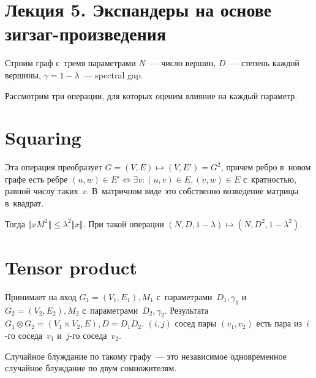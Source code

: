 \documentclass{article}
\begin{document}
\section*{Лекция 5. Экспандеры на основе зигзаг-произведения}
\resetcntrs

Строим граф с~тремя параметрами $N$~--- число вершин, $D$~--- степень каждой
вершины, $\gamma = 1 - \lambda$~--- spectral gap.

Рассмотрим три операции, для которых оценим влияние на каждый параметр.

\section{Squaring}

Эта операция преобразует $G = (V, E) \mapsto (V, E') = G^2$, причем ребро
в~новом графе есть ребре $(u, w) \in E' \Leftrightarrow \exists v: (u, v) \in E,
(v, w) \in E$ с~кратностью, равной числу таких~$v$. В~матричном виде это
собственно возведение матрицы в~квадрат.

Тогда $\Vert xM^2 \Vert \le \lambda^2 \Vert x \Vert$. При такой операции $(N, D,
1 - \lambda) \mapsto (N, D^2, 1 - \lambda^2)$.

\section{Tensor product}

Принимает на вход $G_1 = (V_1, E_1), M_1$ с~параметрами~$D_1, \gamma_1$ и~$G_2 =
(V_2, E_2), M_2$ с~параметрами~$D_2, \gamma_2$. Результата $G_1 \otimes G_2 =
(V_1 \times V_2, E), D = D_1 D_2$. $(i, j)$ сосед пары $(v_1, v_2)$ есть пара
из~$i$-го соседа~$v_1$ и~$j$-го соседа~$v_2$.

Случайное блуждание по такому графу~--- это независимое одновременное случайное
блуждание по двум сомножителям.
\end{document}
